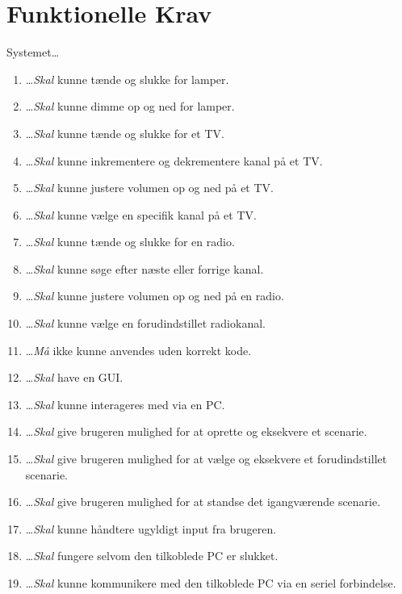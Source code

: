 \section{Funktionelle Krav} \label{FunkKrav}
Systemet\ldots
\begin{enumerate}\itemsep1pt \parskip0pt 
	\item \ldots \emph{Skal} kunne tænde og slukke for lamper.
	\item \ldots \emph{Skal} kunne dimme op og ned for lamper.
	\item \ldots \emph{Skal} kunne tænde og slukke for et TV.
	\item \ldots \emph{Skal} kunne inkrementere og dekrementere kanal på et TV.
	\item \ldots \emph{Skal} kunne justere volumen op og ned på et TV.
	\item \ldots \emph{Skal} kunne vælge en specifik kanal på et TV.
	\item \ldots \emph{Skal} kunne tænde og slukke for en radio.
	\item \ldots \emph{Skal} kunne søge efter næste eller forrige kanal.
	\item \ldots \emph{Skal} kunne justere volumen op og ned på en radio.
	\item \ldots \emph{Skal} kunne vælge en forudindstillet radiokanal.
	\item \ldots \emph{Må} ikke kunne anvendes uden korrekt kode.
	\item \ldots \emph{Skal} have en GUI.
	\item \ldots \emph{Skal} kunne interageres med via en PC.
	\item \ldots \emph{Skal} give brugeren mulighed for at oprette og eksekvere et scenarie.
	\item \ldots \emph{Skal} give brugeren mulighed for at vælge og eksekvere et forudindstillet scenarie.
	\item \ldots \emph{Skal} give brugeren mulighed for at standse det igangværende scenarie.
	\item \ldots \emph{Skal} kunne håndtere ugyldigt input fra brugeren.
	\item \ldots \emph{Skal} fungere selvom den tilkoblede PC er slukket.
	\item \ldots \emph{Skal} kunne kommunikere med den tilkoblede PC via en seriel forbindelse.
\end{enumerate}

